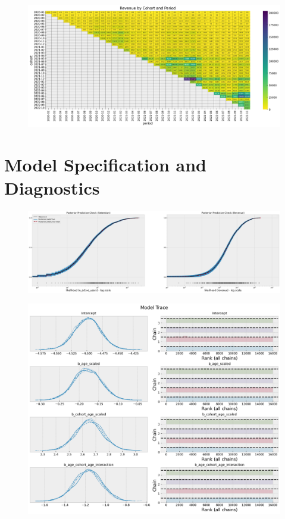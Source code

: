 \documentclass[11pt]{amsart}
\begin{document}
\begin{figure}
    \includegraphics[width=\textwidth]{images/revenue_retention_23_0.png}
\end{figure}

\section{Model Specification and Diagnostics}

\begin{figure}
    \includegraphics[width=\textwidth]{images/revenue_retention_37_0.png}
\end{figure}

\begin{figure}
    \includegraphics[width=\textwidth]{images/revenue_retention_41_0.png}
\end{figure}
\end{document}
